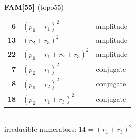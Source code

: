 \documentclass[10pt]{article}
\begin{document}
\begin{minipage}[t]{0.48\textwidth}
{}\\[2mm]\textbf{FAM[55]} (topo55)\\[2pt]{\footnotesize\begin{tabular}{@{}r@{\ \ }l@{\ \ }l@{}}\textbf{6} & $(p_1+r_1)^2$ & amplitude\\
\textbf{13} & $(r_2+r_3)^2$ & amplitude\\
\textbf{22} & $(p_1+r_1+r_2+r_3)^2$ & amplitude\\
\textbf{7} & $(p_2+r_1)^2$ & conjugate\\
\textbf{8} & $(p_1+r_2)^2$ & conjugate\\
\textbf{18} & $(p_2+r_1+r_3)^2$ & conjugate\\\end{tabular}}\\[2pt]{\scriptsize irreducible numerators: 14 = $(r_1+r_3)^2$}\end{minipage}

\bigskip
\end{document}
